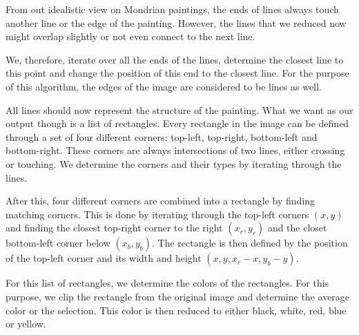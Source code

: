 From out idealistic view on Mondrian paintings, the ends of lines always touch
another line or the edge of the painting. However, the lines that we reduced now
might overlap slightly or not even connect to the next line.

We, therefore, iterate over all the ends of the lines, determine the closest
line to this point and change the position of this end to the closest line. For
the purpose of this algorithm, the edges of the image are considered to be lines
as well.

All lines should now represent the structure of the painting. What we want as
our output though is a list of rectangles. Every rectangle in the image can be
defined through a set of four different corners: top-left, top-right,
bottom-left and bottom-right. These corners are always intersections of two
lines, either crossing or touching. We determine the corners and their types by
iterating through the lines.

After this, four different corners are combined into a rectangle by finding
matching corners. This is done by iterating through the top-left corners $(x,y)$
and finding the closest top-right corner to the right $(x_r, y_r)$ and the
closet bottom-left corner below $(x_b, y_b)$. The rectangle is then defined by
the position of the top-left corner and its width and height
$(x,y,x_r-x,y_b-y)$.

For this list of rectangles, we determine the colors of the rectangles. For this
purpose, we clip the rectangle from the original image and determine the average
color or the selection. This color is then reduced to either black, white, red,
blue or yellow.
